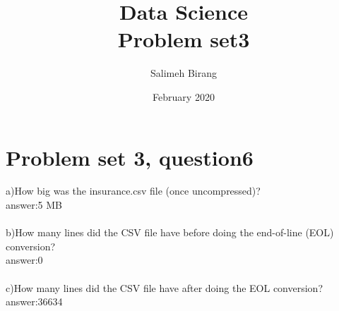 \documentclass{article}
\title{Data Science\\ Problem set3}
\author{Salimeh Birang}
\date{February 2020}
\begin{document}
\maketitle

\section*{Problem set 3, question6}
a)How big was the insurance.csv file (once uncompressed)?\\
answer:5 MB\\
\\
b)How many lines did the CSV file have before doing the end-of-line (EOL) conversion?
\\
answer:0\\
\\
c)How many lines did the CSV file have after doing the EOL conversion?\\
answer:36634\\




\end{document}
